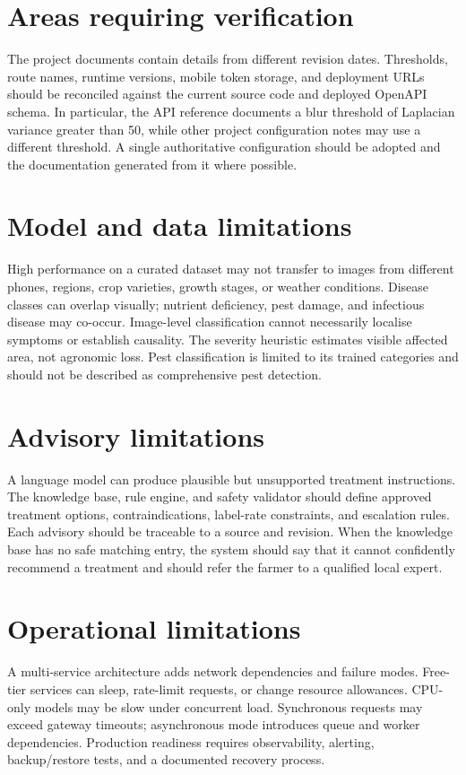 \documentclass[12pt,a4paper,oneside,openany]{report}
\begin{document}
\section{Areas requiring verification}
The project documents contain details from different revision dates. Thresholds, route names, runtime versions, mobile token storage, and deployment URLs should be reconciled against the current source code and deployed OpenAPI schema. In particular, the API reference documents a blur threshold of Laplacian variance greater than 50, while other project configuration notes may use a different threshold. A single authoritative configuration should be adopted and the documentation generated from it where possible.

\section{Model and data limitations}
High performance on a curated dataset may not transfer to images from different phones, regions, crop varieties, growth stages, or weather conditions. Disease classes can overlap visually; nutrient deficiency, pest damage, and infectious disease may co-occur. Image-level classification cannot necessarily localise symptoms or establish causality. The severity heuristic estimates visible affected area, not agronomic loss. Pest classification is limited to its trained categories and should not be described as comprehensive pest detection.

\section{Advisory limitations}
A language model can produce plausible but unsupported treatment instructions. The knowledge base, rule engine, and safety validator should define approved treatment options, contraindications, label-rate constraints, and escalation rules. Each advisory should be traceable to a source and revision. When the knowledge base has no safe matching entry, the system should say that it cannot confidently recommend a treatment and should refer the farmer to a qualified local expert.

\section{Operational limitations}
A multi-service architecture adds network dependencies and failure modes. Free-tier services can sleep, rate-limit requests, or change resource allowances. CPU-only models may be slow under concurrent load. Synchronous requests may exceed gateway timeouts; asynchronous mode introduces queue and worker dependencies. Production readiness requires observability, alerting, backup/restore tests, and a documented recovery process.
\end{document}

